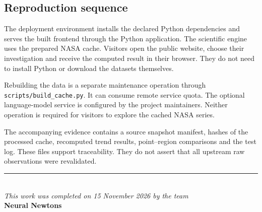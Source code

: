 \documentclass[10pt,a4paper,twocolumn]{article}
\newcommand{\code}[1]{\texttt{#1}}
\begin{document}
\subsection{Reproduction sequence}
The deployment environment installs the declared Python dependencies and serves the built frontend through the Python application. The scientific engine uses the prepared NASA cache. Visitors open the public website, choose their investigation and receive the computed result in their browser. They do not need to install Python or download the datasets themselves.

Rebuilding the data is a separate maintenance operation through \code{scripts/build\_cache.py}. It can consume remote service quota. The optional language-model service is configured by the project maintainers. Neither operation is required for visitors to explore the cached NASA series.

The accompanying evidence contains a source snapshot manifest, hashes of the processed cache, recomputed trend results, point--region comparisons and the test log. These files support traceability. They do not assert that all upstream raw observations were revalidated.
\vspace*{\fill}
\begin{center}
\rule{0.55\textwidth}{0.4pt}\\[10pt]
\textit{This work was completed on 15 November 2026 by the team}\\[6pt]
{\large\bfseries Neural Newtons}
\end{center}
\end{document}
